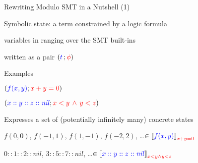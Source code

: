 \documentclass[11pt]{beamer}
\begin{document}
\begin{frame}{Rewriting Modulo SMT in a Nutshell (1)}
\begin{outeritemize}
    \item \alert{Symbolic state}: a term  constrained by a logic formula \red{$\phi$}
    
    \begin{inneritemize}
        \item variables in  ranging over the \alert{SMT built-ins}
        \item written as a pair $\left( \textcolor{blue}{t} \,; \textcolor{red}{\phi} \right)$
    \end{inneritemize}
    
    \pause
    \item Examples
    
    \begin{inneritemize}
        \item $(\textcolor{blue}{f(x, y)}; \textcolor{red}{x + y = 0})$
        \item $(\textcolor{blue}{x :: y :: z :: \mathit{nil}}; \textcolor{red}{x < y \,\wedge\, y < z})$ 
    \end{inneritemize}
    
    \pause
    \item Expresses a set of (potentially infinitely many) concrete
      states \hfill{}

    \begin{inneritemize}
        \item $f(0,0)$, $f(-1,1)$, $f(1,-1)$, $f(-2, 2)$, \ldots \hfill$\in \left\llbracket \textcolor{blue}{f(x, y)} \right\rrbracket_{\textcolor{red}{x + y = 0}}$
        \pause
        \item $0 :: 1 :: 2 :: \mathit{nil}$\;, $3 :: 5 :: 7 :: \mathit{nil}$, \ldots \hfill$\in \left\llbracket \textcolor{blue}{x :: y :: z :: \mathit{nil}} \right\rrbracket_{\textcolor{red}{x < y \wedge y < z}}$
    \end{inneritemize}
    
\end{outeritemize}
\end{frame}
\end{document}
